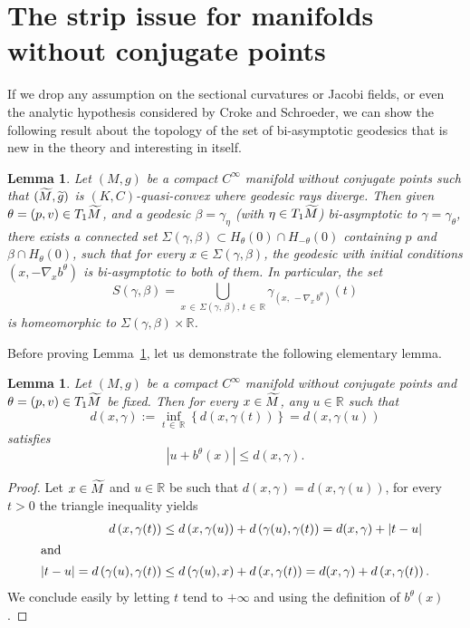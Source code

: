 \documentclass[10pt]{amsart}
\newtheorem{lemm}[cdrthm]{Lemma}
\theoremstyle{definition}
\newcommand{\bbR}{\mathbb{R}}
\let\oldtilde\tilde
\renewcommand*{\tilde}[1]{\mathchoice{\widetilde{#1}}{\widetilde{#1}}{\oldtilde{#1}}{\oldtilde{#1}}}
\begin{document}
\section{The strip issue for manifolds without conjugate points}\label{SECstrip}

If we drop any assumption on the sectional curvatures or Jacobi fields, or even the analytic hypothesis considered by Croke and Schroeder, we can show the following result about the topology of the set of bi-asymptotic geodesics that is new in the theory and interesting in itself.

\begin{lemm}\label{strip}
Let $(M,g)$ be a compact $C^{\infty}$ manifold without conjugate points such that $(\tilde{M}, \tilde{g})$ is $(K,C)$-quasi-convex where geodesic rays diverge. Then given $\theta = (p,v) \in T_{1}\tilde{M}$, and a geodesic $\beta=\gamma_{\eta}$ (with $\eta \in T_{1}\tilde{M}$) bi-asymptotic to $\gamma = \gamma_{\theta}$, there exists a connected set $\Sigma(\gamma, \beta) \subset H_{\theta}(0) \cap H_{-\theta}(0)$ containing $p$ and $\beta \cap H_{\theta}(0)$, such that for every $x \in \Sigma(\gamma, \beta)$, the geodesic with initial conditions $(x, -\nabla_{x} b^{\theta})$ is bi-asymptotic to both of them. In particular, the set
\[
S(\gamma, \beta) = \bigcup_{x\,\in\,\Sigma(\gamma,\,\beta),\,t\, \in\,\bbR} \gamma_{\left(x,\,-\nabla_{x}\,b^{\theta}\right)}(t)
\]
is homeomorphic to $\Sigma(\gamma, \beta) \times \bbR$.
\end{lemm}

Before proving Lemma~\ref{strip}, let us demonstrate the following elementary lemma.

\begin{lemm}\label{lemLR}
Let $(M,g)$ be a compact $C^{\infty}$ manifold without conjugate points and $\theta = (p,v) \in T_{1}\tilde{M}$ be fixed. Then for every $x\in \tilde{M}$, any $u\in \bbR$ such that
\[
d(x,\gamma) := \inf_{t\,\in\,\bbR} \left\{d \left(x,\gamma(t) \right) \right\} = d(x,\gamma(u))
\]
satisfies
\[
\left| u + b^{\theta}(x)\right| \leq d(x,\gamma).
\]
\end{lemm}

\begin{proof}
Let $x\in \tilde{M}$ and $u\in \bbR $ be such that $d(x,\gamma) =d(x,\gamma(u))$, for every $t>0$ the triangle inequality yields
\begin{align*}
d\left(x,\gamma(t) \right) &\leq d\left(x,\gamma(u)\right) + d\left(\gamma(u),\gamma(t)\right) = d(x,\gamma) + |t-u|\\
\intertext{and}
|t-u| = d\left(\gamma(u),\gamma(t) \right) &\leq d\left(\gamma(u),x\right) + d\left(x,\gamma(t)\right) = d(x,\gamma) + d\left(x,\gamma(t)\right).
\end{align*}
We conclude easily by letting $t$ tend to $+\infty$ and using the definition of $b^{\theta}(x)$.
\end{proof}
\end{document}
